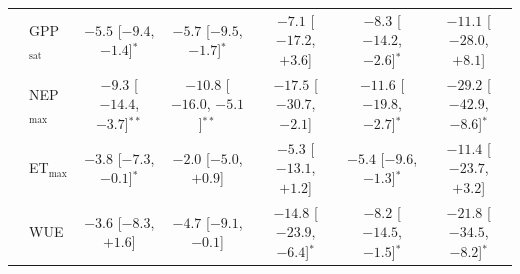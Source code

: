 \begin{table}[htbp]
{\begin{tabular}{llccccc}
\midrule
{} & GPP$_\mathrm{sat}$ & $-5.5$ {\tiny[$-9.4$, $-1.4$]}$^{*}$ & $-5.7$ {\tiny[$-9.5$, $-1.7$]}$^{*}$ & $-7.1$ {\tiny[$-17.2$, $+3.6$]} & $-8.3$ {\tiny[$-14.2$, $-2.6$]}$^{*}$ & $-11.1$ {\tiny[$-28.0$, $+8.1$]} \\
 & NEP$_\mathrm{max}$ & $-9.3$ {\tiny[$-14.4$, $-3.7$]}$^{**}$ & $-10.8$ {\tiny[$-16.0$, $-5.1$]}$^{**}$ & $-17.5$ {\tiny[$-30.7$, $-2.1$]} & $-11.6$ {\tiny[$-19.8$, $-2.7$]}$^{*}$ & $-29.2$ {\tiny[$-42.9$, $-8.6$]}$^{*}$ \\
 & ET$_\mathrm{max}$ & $-3.8$ {\tiny[$-7.3$, $-0.1$]}$^{*}$ & $-2.0$ {\tiny[$-5.0$, $+0.9$]} & $-5.3$ {\tiny[$-13.1$, $+1.2$]} & $-5.4$ {\tiny[$-9.6$, $-1.3$]}$^{*}$ & $-11.4$ {\tiny[$-23.7$, $+3.2$]} \\
 & WUE & $-3.6$ {\tiny[$-8.3$, $+1.6$]} & $-4.7$ {\tiny[$-9.1$, $-0.1$]} & $-14.8$ {\tiny[$-23.9$, $-6.4$]}$^{*}$ & $-8.2$ {\tiny[$-14.5$, $-1.5$]}$^{*}$ & $-21.8$ {\tiny[$-34.5$, $-8.2$]}$^{*}$ \\
\bottomrule
\end{tabular}}
\end{table}
